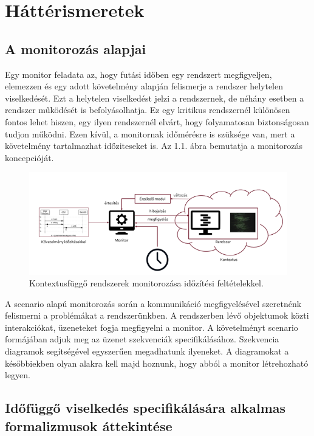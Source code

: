 \chapter{Háttérismeretek}\section{A monitorozás alapjai}

Egy monitor feladata az, hogy futási időben egy rendszert megfigyeljen, elemezzen és egy adott követelmény alapján felismerje a rendszer helytelen viselkedését.
Ezt a helytelen viselkedést jelzi a rendszernek, de néhány esetben a rendszer működését is befolyásolhatja.
Ez egy kritikus rendszernél különösen fontos lehet hiszen, egy ilyen rendszernél elvárt, hogy folyamatosan biztonságosan tudjon működni.
Ezen kívül, a monitornak időmérésre is szüksége van, mert a követelmény tartalmazhat időziteseket is.
Az 1.1. ábra bemutatja a monitorozás koncepcióját.

\begin{figure}[!ht]
    \centering
    \includegraphics[width=150mm, keepaspectratio]{figures/1abra.png}
    \caption{Kontextusfüggő rendszerek monitorozása időzítési feltételekkel.}
\end{figure}

A scenario alapú monitorozás során a kommunikáció megfigyelésével szeretnénk felismerni a problémákat a rendszerünkben.
A rendszerben lévő objektumok közti interakciókat, üzeneteket fogja megfigyelni a monitor.
A követelményt scenario formájában adjuk meg az üzenet szekvenciák specifikálásához.
Szekvencia diagramok segítségével egyszerűen megadhatunk ilyeneket.
A diagramokat a későbbiekben olyan alakra kell majd hoznunk, hogy abból a monitor létrehozható legyen.

\clearpage\section{Időfüggő viselkedés specifikálására alkalmas formalizmusok áttekintése}
